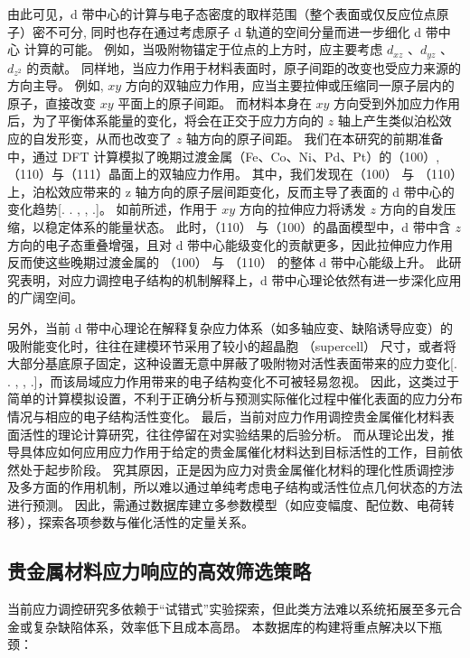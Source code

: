 由此可见，d 带中心的计算与电子态密度的取样范围（整个表面或仅反应位点原子）密不可分, 同时也存在通过考虑原子 d 轨道的空间分量而进一步细化 d 带中心
计算的可能。
例如，当吸附物锚定于位点的上方时，应主要考虑
$d_{xz}$ 、$d_{yz}$ 、$d_{z^{2}}$ 的贡献。
同样地，当应力作用于材料表面时，原子间距的改变也受应力来源的方向主导。
例如, $xy$
方向的双轴应力作用，应当主要拉伸或压缩同一原子层内的原子，直接改变 $xy$ 平面上的原子间距。
而材料本身在 $xy$  方向受到外加应力作用后，为了平衡体系能量的变化，将会在正交于应力方向的 $z$ 轴上产生类似泊松效应的自发形变，从而也改变了 $z$ 轴方向的原子间距。
我们在本研究的前期准备中，通过 DFT 计算模拟了晚期过渡金属（Fe、Co、Ni、Pd、Pt）的（100）,
（110）与（111）晶面上的双轴应力作用。
其中，我们发现在（100） 与
（110）上，泊松效应带来的 z
轴方向的原子层间距变化，反而主导了表面的 d 带中心的变化趋势[\@. \@. \@,
\@, \@.]。
如前所述，作用于 $xy$ 方向的拉伸应力将诱发 $z$ 方向的自发压缩，以稳定体系的能量状态。
此时，（110） 与（100）的晶面模型中，d 带中含 $z$ 方向的电子态重叠增强，且对 d 带中心能级变化的贡献更多，因此拉伸应力作用反而使这些晚期过渡金属的 （100） 与 （110） 的整体 d 带中心能级上升。
此研究表明，对应力调控电子结构的机制解释上，d 带中心理论依然有进一步深化应用的广阔空间。

另外，当前 d 带中心理论在解释复杂应力体系（如多轴应变、缺陷诱导应变）的吸附能变化时，往往在建模环节采用了较小的超晶胞 （supercell） 尺寸，或者将大部分基底原子固定，这种设置无意中屏蔽了吸附物对活性表面带来的应力变化[\@. \@. \@, \@, \@.]，而该局域应力作用带来的电子结构变化不可被轻易忽视。
因此，这类过于简单的计算模拟设置，不利于正确分析与预测实际催化过程中催化表面的应力分布情况与相应的电子结构活性变化。
最后，当前对应力作用调控贵金属催化材料表面活性的理论计算研究，往往停留在对实验结果的后验分析。
而从理论出发，推导具体应如何应用应力作用于给定的贵金属催化材料达到目标活性的工作，目前依然处于起步阶段。
究其原因，正是因为应力对贵金属催化材料的理化性质调控涉及多方面的作用机制，所以难以通过单纯考虑电子结构或活性位点几何状态的方法进行预测。
因此，需通过数据库建立多参数模型（如应变幅度、配位数、电荷转移），探索各项参数与催化活性的定量关系。

\subsection{贵金属材料应力响应的高效筛选策略}

当前应力调控研究多依赖于``试错式''实验探索，但此类方法难以系统拓展至多元合金或复杂缺陷体系，效率低下且成本高昂。
本数据库的构建将重点解决以下瓶颈：

